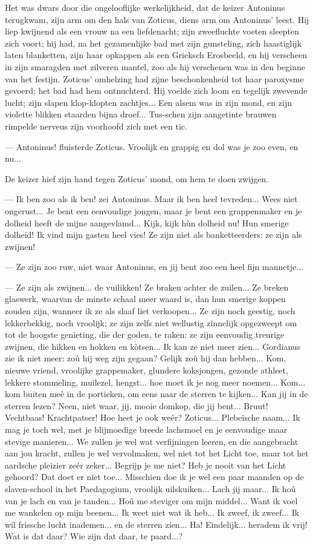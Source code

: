 \documentclass[a4paper, 12pt, oneside, dutch]{article}
\begin{document}
Het was dwars door die ongelooflijke werkelijkheid, dat de keizer Antoninus terugkwam, zijn arm om den hals van Zoticus, diens arm om Antoninus' leest. Hij liep kwijnend als een vrouw na een liefdenacht; zijn zweefluchte voeten sleepten zich voort; hij had, na het gezamenlijke bad met zijn gunsteling, zich haastiglijk laten blanketten, zijn haar opkappen als een Grieksch Erosbeeld, en hij verscheen in zijn smaragden met zilveren mantel, zoo als hij verschenen was in den beginne van het festijn. Zoticus' omhelzing had zijne beschonkenheid tot haar paroxysme gevoerd; het bad had hem ontnuchterd. Hij voelde zich loom en tegelijk zwevende lucht; zijn slapen klop-klopten zachtjes... Een alsem was in zijn mond, en zijn violette blikken staarden bijna droef... Tus-schen zijn aangetinte brauwen rimpelde nerveus zijn voorhoofd zich met een tic.

--- Antoninus! fluisterde Zoticus. Vroolijk en grappig en dol was je zoo even, en nu...

De keizer hief zijn hand tegen Zoticus' mond, om hem te doen zwijgen.

--- Ik ben zoo als ik ben! zei Antoninus. Maar ik ben heel tevreden... Wees niet ongerust... Je bent een eenvoudige jongen, maar je bent een grappenmaker en je dolheid heeft de mijne aangevlamd... Kijk, kijk hùn dolheid nu! Hun smerige dolheid! Ik vind mijn gasten heel vies! Ze zijn niet als banketteerders: ze zijn als zwijnen!

--- Ze zijn zoo ruw, niet waar Antoninus, en jij bent zoo een heel fijn mannetje...

--- Ze zijn als zwijnen... de vuilikken! Ze braken achter de zuilen... Ze breken glaswerk, waarvan de minste schaal meer waard is, dan hun smerige koppen zouden zijn, wanneer ik ze als slaaf liet verkoopen... Ze zijn noch geestig, noch lekkerbekkig, noch vroolijk; ze zijn zelfs niet wellustig zinnelijk opgezweept om tot de hoogste genieting, die der goden, te raken: ze zijn eenvoudig treurige zwijnen, die hikken en hokken en kòtsen... Ik kan ze niet meer zien... Gordianus zie ik niet meer: zoû hij weg zijn gegaan? Gelijk zoû hij dan hebben... Kom, nieuwe vriend, vroolijke grappemaker, glundere koksjongen, gezonde athleet, lekkere stommeling, muilezel, hengst... hoe moet ik je nog meer noemen... Kom... kom buiten meê in de portieken, om eens naar de sterren te kijken... Kan jij in de sterren lezen? Neen, niet waar, jij, mooie domkop, die jij bent... Bruut! Vechtbaas! Krachtpatser! Hoe heet je ook weêr? Zoticus... Plebeïsche naam... Ik mag je toch wel, met je blijmoedige breede lachsmoel en je eenvoudige maar stevige manieren... We zullen je wel wat verfijningen leeren, en die aangebracht aan jou kracht, zullen je wel vervolmaken, wel niet tot het Licht toe, maar tot het aardsche pleizier zeér zeker... Begrijp je me niet? Heb je nooit van het Licht gehoord? Dat doet er niet toe... Misschien doe ik je wel een paar maanden op de slaven-school in het Paedagogium, vroolijk uilskuiken... Lach jij maar... Ik hoû van je lach en van je tanden... Hoû me steviger om mijn middel... Want ik voel me wankelen op mijn beenen... Ik weet niet wat ik heb... Ik zweef, ik zweef... Ik wil frissche lucht inademen... en de sterren zien... Ha! Eindelijk... heradem ik vrij! Wat is dat daar? Wie zijn dat daar, te paard...?
\end{document}
